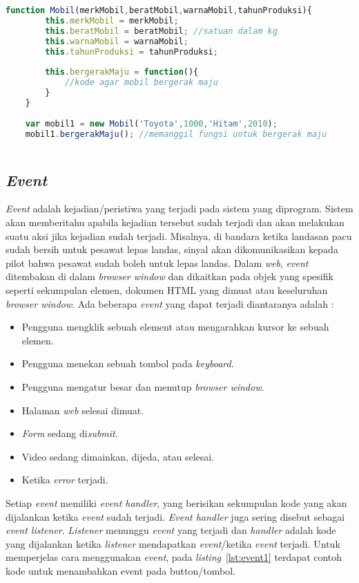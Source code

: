 \begin{lstlisting}[language=Javascript, caption=Membuat dan memanggil method bergerakMaju(), label={lst:method}]
	function Mobil(merkMobil,beratMobil,warnaMobil,tahunProduksi){
		this.merkMobil = merkMobil;
		this.beratMobil = beratMobil; //satuan dalam kg
		this.warnaMobil = warnaMobil;
		this.tahunProduksi = tahunProduksi;
		
		this.bergerakMaju = function(){
			//kode agar mobil bergerak maju
		}
	}
	
	var mobil1 = new Mobil('Toyota',1000,'Hitam',2010);
	mobil1.bergerakMaju(); //memanggil fungsi untuk bergerak maju
	
\end{lstlisting}

\subsection{\textit{Event}}
\textit{Event} adalah kejadian/peristiwa yang terjadi pada sistem yang diprogram. Sistem akan memberitahu apabila kejadian tersebut sudah terjadi dan akan melakukan suatu aksi jika kejadian sudah terjadi. Misalnya, di bandara ketika landasan pacu sudah bersih untuk pesawat lepas landas, sinyal akan dikomunikasikan kepada pilot bahwa pesawat sudah boleh untuk lepas landas. Dalam \textit{web}, \textit{event} ditembakan di dalam \textit{browser window} dan dikaitkan pada objek yang spesifik seperti sekumpulan elemen, dokumen HTML yang dimuat atau keseluruhan \textit{browser window}. Ada beberapa \textit{event} yang dapat terjadi diantaranya adalah : 

\begin{itemize}
	\item Pengguna mengklik sebuah element atau mengarahkan kursor ke sebuah elemen.
	\item Pengguna menekan sebuah tombol pada \textit{keyboard}.
	\item Pengguna mengatur besar dan menutup \textit{browser window}.
	\item Halaman \textit{web} selesai dimuat.
	\item \textit{Form} sedang di\textit{submit}.
	\item Video sedang dimainkan, dijeda, atau selesai.
	\item Ketika \textit{error} terjadi.
\end{itemize}

Setiap \textit{event} memiliki \textit{event handler}, yang berisikan sekumpulan kode yang akan dijalankan ketika \textit{event} sudah terjadi. \textit{Event handler} juga sering disebut sebagai \textit{event listener}. \textit{Listener} menunggu \textit{event} yang terjadi dan \textit{handler} adalah kode yang dijalankan ketika \textit{listener} mendapatkan \textit{event}/ketika \textit{event} terjadi. Untuk memperjelas cara menggunakan \textit{event}, pada \textit{listing}~\ref{lst:event1} terdapat contoh kode untuk menambahkan event pada button/tombol.

